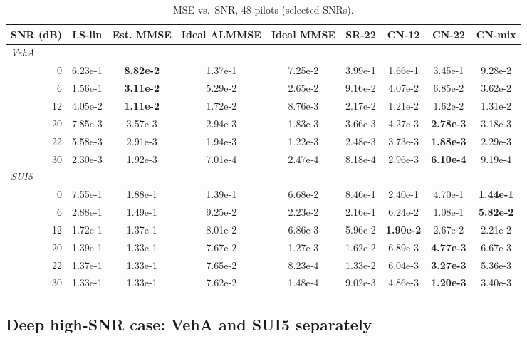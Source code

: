 \documentclass[10pt,a4paper]{article}
\begin{document}
\begin{table}[!htbp]
  \centering
  \caption{MSE vs.\ SNR, 48 pilots (selected SNRs).}
  \label{tab:mse_snr}
  \small
  \setlength{\tabcolsep}{4.5pt}
  \begin{tabular}{rcccccccc}
    \toprule
    SNR (dB) & LS-lin & Est. MMSE & Ideal ALMMSE & Ideal MMSE & SR-22 & CN-12 & CN-22 & CN-mix \\
    \midrule
    \multicolumn{9}{l}{\textit{VehA}} \\
    0 & 6.23e-1 & \textbf{8.82e-2} & 1.37e-1 & 7.25e-2 & 3.99e-1 & 1.66e-1 & 3.45e-1 & 9.28e-2 \\
    6 & 1.56e-1 & \textbf{3.11e-2} & 5.29e-2 & 2.65e-2 & 9.16e-2 & 4.07e-2 & 6.85e-2 & 3.62e-2 \\
    12 & 4.05e-2 & \textbf{1.11e-2} & 1.72e-2 & 8.76e-3 & 2.17e-2 & 1.21e-2 & 1.62e-2 & 1.31e-2 \\
    20 & 7.85e-3 & 3.57e-3 & 2.94e-3 & 1.83e-3 & 3.66e-3 & 4.27e-3 & \textbf{2.78e-3} & 3.18e-3 \\
    22 & 5.58e-3 & 2.91e-3 & 1.94e-3 & 1.22e-3 & 2.48e-3 & 3.73e-3 & \textbf{1.88e-3} & 2.29e-3 \\
    30 & 2.30e-3 & 1.92e-3 & 7.01e-4 & 2.47e-4 & 8.18e-4 & 2.96e-3 & \textbf{6.10e-4} & 9.19e-4 \\
    \midrule
    \multicolumn{9}{l}{\textit{SUI5}} \\
    0 & 7.55e-1 & 1.88e-1 & 1.39e-1 & 6.68e-2 & 8.46e-1 & 2.40e-1 & 4.70e-1 & \textbf{1.44e-1} \\
    6 & 2.88e-1 & 1.49e-1 & 9.25e-2 & 2.23e-2 & 2.16e-1 & 6.24e-2 & 1.08e-1 & \textbf{5.82e-2} \\
    12 & 1.72e-1 & 1.37e-1 & 8.01e-2 & 6.86e-3 & 5.96e-2 & \textbf{1.90e-2} & 2.67e-2 & 2.21e-2 \\
    20 & 1.39e-1 & 1.33e-1 & 7.67e-2 & 1.27e-3 & 1.62e-2 & 6.89e-3 & \textbf{4.77e-3} & 6.67e-3 \\
    22 & 1.37e-1 & 1.33e-1 & 7.65e-2 & 8.23e-4 & 1.33e-2 & 6.04e-3 & \textbf{3.27e-3} & 5.36e-3 \\
    30 & 1.33e-1 & 1.33e-1 & 7.62e-2 & 1.48e-4 & 9.02e-3 & 4.86e-3 & \textbf{1.20e-3} & 3.40e-3 \\
    \bottomrule
  \end{tabular}
\end{table}

\subsection{Deep high-SNR case: VehA and SUI5 separately}
\end{document}
